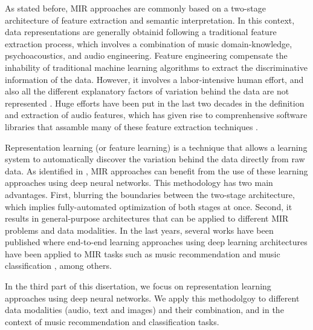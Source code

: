 
As stated before, MIR approaches are commonly based on a two-stage architecture of feature extraction and semantic interpretation. In this context, data representations are generally obtainid following a traditional feature extraction process, which involves a combination of music domain-knowledge, psychoacoustics, and audio engineering. 
Feature engineering compensate the inhability of traditional machine learning algorithms to extract the discriminative information of the data. However, it involves a labor-intensive human effort, and also all the different explanatory factors of variation behind the data are not represented \cite{bengio2013representation}. 
Huge efforts have been put in the last two decades in the definition and extraction of audio features, which has given rise to comprenhensive software libraries that assamble many of these feature extraction techniques \cite{Essentia, Librosa}. 

Representation learning (or feature learning) is a technique that allows a learning system to automatically discover the variation behind the data directly from raw data. As identified in \cite{humphrey2012}, MIR approaches can benefit from the use of these learning approaches using deep neural networks. This methodology has two main advantages. First, blurring the boundaries between the two-stage architecture, which implies fully-automated optimization of both stages at once. Second, it results in general-purpose architectures that can be applied to different MIR problems and data modalities. In the last years, several works have been published where end-to-end learning approaches using deep learning architectures have been applied to MIR tasks such as music recommendation \cite{Oord2013} and music classification \cite{Choi2016}, among others.

In the third part of this disertation, we focus on representation learning approaches using deep neural networks. We apply this methodolgoy to different data modalities (audio, text and images) and their combination, and in the context of music recommendation and classification tasks.


